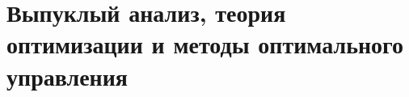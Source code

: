 \documentclass[../../book-ru.tex]{subfiles}
\begin{document}
\chapter{Выпуклый анализ, теория оптимизации и методы оптимального управления}
\label{ch:2.4-convex-optimization-ru}



















\end{document}
